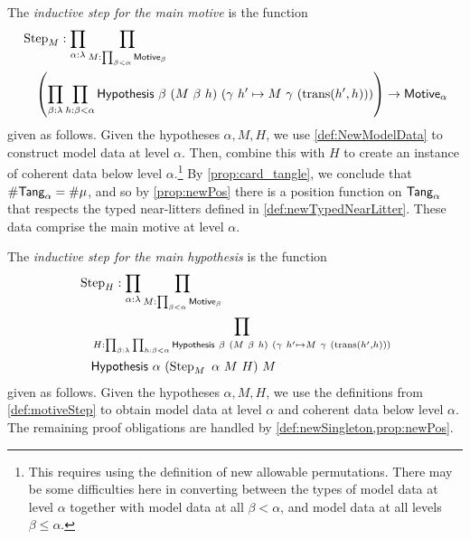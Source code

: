 \begin{definition}
  \label{def:motiveStep}
  The \emph{inductive step for the main motive} is the function
  \begin{align*}
    &\operatorname{Step}_M : \prod_{\alpha : \lambda} \prod_{M : \prod_{\beta < \alpha} \Motive_\beta} \\
    &\quad\left( \prod_{\beta : \lambda} \prod_{h : \beta < \alpha} \Hypothesis\ \beta\ (M\ \beta\ h)\ (\gamma\ h' \mapsto M\ \gamma\ (\operatorname{trans}(h',h))) \right) \to \Motive_\alpha
  \end{align*}
  given as follows.
  Given the hypotheses \( \alpha, M, H \), we use \cref{def:NewModelData} to construct model data at level \( \alpha \).
  Then, combine this with \( H \) to create an instance of coherent data below level \( \alpha \).\footnote{This requires using the definition of new allowable permutations. There may be some difficulties here in converting between the types of model data at level \( \alpha \) together with model data at all \( \beta < \alpha \), and model data at all levels \( \beta \leq \alpha \).}
  By \cref{prop:card_tangle}, we conclude that \( \#\mathsf{Tang}_\alpha = \#\mu \), and so by \cref{prop:newPos} there is a position function on \( \mathsf{Tang}_\alpha \) that respects the typed near-litters defined in \cref{def:newTypedNearLitter}.
  These data comprise the main motive at level \( \alpha \).
\end{definition}
\begin{definition}
  \label{def:hypothesisStep}
  The \emph{inductive step for the main hypothesis} is the function
  \begin{align*}
    &\operatorname{Step}_H : \prod_{\alpha : \lambda} \prod_{M : \prod_{\beta < \alpha} \Motive_\beta} \\
    &\quad\prod_{H : \prod_{\beta : \lambda} \prod_{h : \beta < \alpha} \Hypothesis\ \beta\ (M\ \beta\ h)\ (\gamma\ h' \mapsto M\ \gamma\ (\operatorname{trans}(h',h)))}\\
    &\quad\Hypothesis\ \alpha\ (\operatorname{Step}_M\ \alpha\ M\ H)\ M
  \end{align*}
  given as follows.
  Given the hypotheses \( \alpha, M, H \), we use the definitions from \cref{def:motiveStep} to obtain model data at level \( \alpha \) and coherent data below level \( \alpha \).
  The remaining proof obligations are handled by \cref{def:newSingleton,prop:newPos}.
\end{definition}
